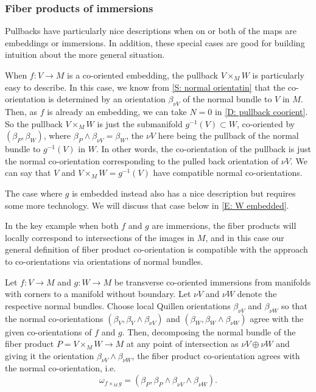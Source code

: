  


\subsubsection{Fiber products of immersions}\label{S: co-or product immersion}

Pullbacks have particularly nice descriptions when on or both of the maps are embeddings or immersions. In addition, these special cases are good for building intuition about the more general situation.  


\begin{example}\label{E: V embedded}
When $f:V\to M$ is a co-oriented embedding, the pullback $V\times_MW$ is particularly easy to describe. In this case, we know from \cref{S: normal orientatin} that the co-orientation is determined by an orientation $\beta_{\nu V}$ of the normal bundle to $V$ in $M$. Then, as $f$ is already an embedding, we can take $N=0$ in \cref{D: pullback coorient}. So the pullback $V\times_MW$ is just the submanifold $g^{-1}(V)\subset W$, co-oriented by $(\beta_P,\beta_W)$, where $\beta_P\wedge \beta_{\nu V}=\beta_W$, the $\nu V$ here being the pullback of the normal bundle to $g^{-1}(V)$ in $W$. In other words, the co-orientation of the pullback is just the normal co-orientation corresponding to the pulled back orientation of $\nu V$. We can say that $V$ and $V\times_MW =g^{-1}(V)$ have compatible normal co-orientations. 

The case where $g$ is embedded instead also has a nice description but requires some more technology. We will discuss that case below in \cref{E: W embedded}.
\end{example}






In the key example when both $f$ and $g$ are immersions, the fiber products will locally correspond to intersections of the images in $M$, and in this case our general definition of fiber product co-orientation is compatible with the approach to co-orientations via orientations of normal bundles.


\begin{proposition}\label{P: normal pullback}
Let $f : V \to M$ and $g: W \to M$ be transverse co-oriented immersions from manifolds with corners to a manifold without boundary. Let $\nu V$ and $\nu W$ denote the respective normal bundles. 
Choose local Quillen orientations $\beta_{\nu V}$ and  $\beta_{\nu W}$ so that the normal co-orientations $(\beta_V,\beta_V\wedge \beta_{\nu V})$ and  $(\beta_W,\beta_W\wedge \beta_{\nu W})$ agree with the given co-orientations of $f$ and $g$.
Then, decomposing the normal bundle of the fiber product $P=V\times_M W\to M$ at any point of intersection as $\nu V \oplus \nu W$ and giving it the orientation $\beta_{\nu V}\wedge \beta_{\nu W}$, the fiber product co-orientation agrees with the normal co-orientation, i.e.\
$$\omega_{f\times_M g}=(\beta_P,\beta_P\wedge \beta_{\nu V}\wedge \beta_{\nu W}).$$
\end{proposition}

